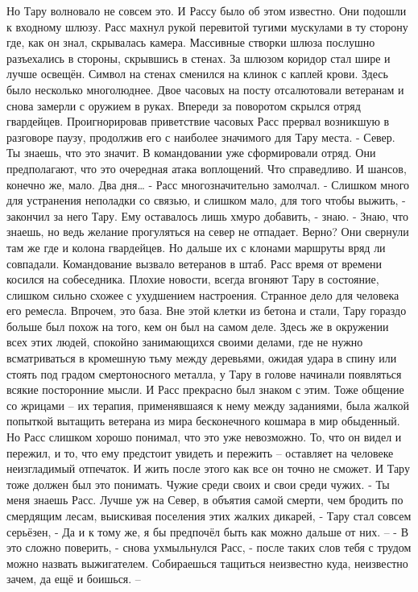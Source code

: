 \documentclass[a4paper, 12pt]{report}
\begin{document}
	Но Тару волновало не совсем это. И Рассу было об этом известно. 
Они подошли к входному шлюзу. Расс махнул рукой перевитой тугими мускулами в ту сторону где, как он знал, скрывалась камера. Массивные створки шлюза послушно разъехались в стороны, скрывшись в стенах.
За шлюзом коридор стал шире и лучше освещён. Символ на стенах сменился на клинок с каплей крови. Здесь было несколько многолюднее. Двое часовых на посту отсалютовали ветеранам и снова замерли с оружием в руках. Впереди за поворотом скрылся отряд гвардейцев. Проигнорировав приветствие часовых Расс прервал возникшую в разговоре паузу, продолжив его с наиболее значимого для Тару места.
- Север. Ты знаешь, что это значит. В командовании уже сформировали отряд. Они предполагают, что это очередная атака воплощений. Что справедливо. И шансов, конечно же, мало. Два дня… - Расс многозначительно замолчал.
 - Слишком много для устранения неполадки со связью, и слишком мало, для того чтобы выжить, - закончил за него Тару. Ему оставалось лишь хмуро добавить, - знаю. 
- Знаю, что знаешь, но ведь желание прогуляться на север не отпадает. Верно?
	Они свернули там же где и колона гвардейцев. Но дальше их с клонами маршруты вряд ли совпадали. Командование вызвало ветеранов в штаб.
Расс время от времени косился на собеседника. Плохие новости, всегда вгоняют Тару в состояние, слишком сильно схожее с ухудшением настроения. Странное дело для человека его ремесла. Впрочем, это база. Вне этой клетки из бетона и стали, Тару гораздо больше был похож на того, кем он был на самом деле. Здесь же в окружении всех этих людей, спокойно занимающихся своими делами, где не нужно всматриваться в кромешную тьму между деревьями, ожидая удара в спину или стоять под градом смертоносного металла, у Тару в голове начинали появляться всякие посторонние мысли. И Расс прекрасно был знаком с этим. Тоже общение со жрицами – их терапия, применявшаяся к нему между заданиями, была жалкой попыткой вытащить ветерана из мира бесконечного кошмара в мир обыденный. Но Расс слишком хорошо понимал, что это уже невозможно. То, что он видел и пережил, и то, что ему предстоит увидеть и пережить – оставляет на человеке неизгладимый отпечаток. И жить после этого как все он точно не сможет. И Тару тоже должен был это понимать.
	Чужие среди своих и свои среди чужих.
 	- Ты меня знаешь Расс. Лучше уж на Север, в объятия самой смерти, чем бродить по смердящим лесам, выискивая поселения этих жалких дикарей, - Тару стал совсем серьёзен, - Да и к тому же, я бы предпочёл быть как можно дальше от них. –
	- В это сложно поверить, - снова ухмыльнулся Расс, - после таких слов тебя с трудом можно назвать выжигателем. Собираешься тащиться неизвестно куда, неизвестно зачем, да ещё и боишься. –
\end{document}
